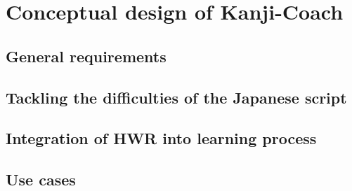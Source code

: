\chapter{Conceptual design of Kanji-Coach}
\section{General requirements}
\section{Tackling the difficulties of the Japanese script}
\section{Integration of HWR into learning process}
\section{Use cases}
